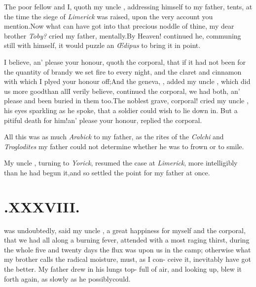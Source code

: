 \documentclass[twoside]{article}
\begin{document}
The poor fellow and I, quoth my uncle \toby, addressing
himself to my father, 
tents, at the time the siege of \textit{Limerick} was raised,
upon the very account you mention.\tsh Now what can
have got\break
into that precious noddle of thine, my dear brother
\textit{Toby?} cried my father,\break 
mentally.\tsh By Heaven! continued\break
he, communing still with himself, it\break
would puzzle an \textit{Œdipus} to bring it in\break
point.\tsh

I believe, an’ please your honour,\break
quoth the corporal, that if
it had not been for the quantity of brandy we set fire to every
night, and the claret and cinnamon with which I plyed your
honour off;\tsk And the geneva, \trim, added my uncle
\toby, which did us more good\break than all\tsh I verily
believe, continued 
the corporal, we had both, an’ please\break
{}\break
and been buried in them too.\tsh The\break
noblest grave, corporal!  cried my uncle\break
\toby, his eyes sparkling as he spoke, that\break
a soldier could wish to lie down in.\tsh\break
But a pitiful death for him!\@ an’ please\break
your honour, replied the corporal.

All this was as much \textit{Arabick} to my father, as the rites
of the \textit{Colchi} and \textit{Tro\-glodites}
\break
my father could not determine whether he was to
frown or to smile.\tsh

My uncle \toby, turning to \textit{Yorick},\break
resumed the case
at \textit{Limerick}, more intelligibly than he had begun
it,\tsk and so settled the point for my father at once.

\vfill
{}
\newpage
\null\smallskip

\section{.\enspace  XXXVIII.}

 was undoubtedly, said my uncle\break
\toby, a great happiness for myself\break
and the corporal, that we
had all along a burning fever, attended with a most raging thirst,
during the whole five and twenty days the flux was upon us in the
camp; otherwise what my brother calls the radical moisture,
must, as I con-\break 
ceive it, inevitably have got the better.\break
\tsh My father drew in his lungs top-\break
full of air, and looking up, blew it\break
forth again, as slowly as he possibly\break could.\tsh
\end{document}
